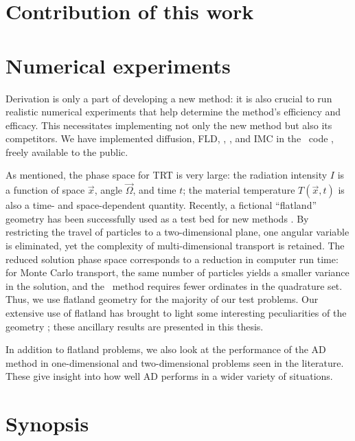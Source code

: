 \section{Contribution of this work}

\section{Numerical experiments}

Derivation is only a part of developing a new method: it is also
crucial to run realistic numerical experiments that help determine the method's
efficiency and efficacy. This necessitates implementing not only the new method
but also its competitors. We have implemented
diffusion, FLD, \Pone, \SN, and IMC in the \pytrt\ code \cite{Pytrt}, freely
available to the public.

As mentioned, the phase space for TRT is very large: the radiation intensity
$I$ is a function of space $\vec{x}$, angle $\vec{\Omega}$, and time $t$;
the material temperature $T(\vec{x},t)$ is also a time- and space-dependent
quantity. Recently, a fictional ``flatland'' geometry has been successfully
used as a test
bed for new methods \cite{Lar2009c,Joh2011,Tra2011}. By restricting the travel
of particles to a two-dimensional plane, one angular variable is eliminated,
yet the complexity of multi-dimensional transport is retained. The
reduced solution phase space corresponds to a reduction in computer run time:
for Monte Carlo transport, the same number of particles yields a smaller
variance in the solution, and the \SN\ method requires fewer ordinates in the
quadrature set. Thus, we use flatland geometry for the majority of our test
problems.
Our extensive use of flatland has brought to light some
interesting peculiarities of the geometry \cite{Joh2011a}; these ancillary
results are presented in this thesis.

In addition to flatland problems, we also look at the performance of the AD
method in one-dimensional and two-dimensional problems seen in the
literature. These give insight into how well AD performs in a wider variety of
situations.

\section{Synopsis}

